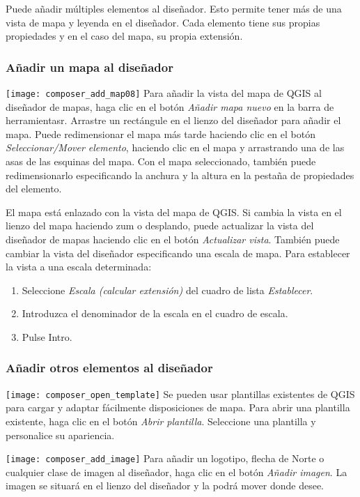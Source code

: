 Puede añadir múltiples elementos al diseñador. Esto permite tener más de una vista de mapa y leyenda en el diseñador. Cada elemento tiene sus propias propiedades y en el caso del mapa, su propia extensión.

\subsubsection{Añadir un mapa al diseñador}

\texttt{[image: composer\_add\_map08]} Para añadir la vista del mapa de QGIS al diseñador de mapas, haga clic en el botón \textit{Añadir mapa nuevo} en la barra de herramientasr. Arrastre un rectángule en el lienzo del diseñador para añadir el mapa. Puede redimensionar el mapa más tarde haciendo clic en el botón \textit{Seleccionar/Mover elemento}, haciendo clic en el mapa y arrastrando una de las asas de las esquinas del mapa. Con el mapa seleccionado, también puede redimensionarlo especificando la anchura y la altura en la pestaña de propiedades del elemento.

El mapa está enlazado con la vista del mapa de QGIS. Si cambia la vista en el lienzo del mapa haciendo zum o desplando, puede actualizar la vista del diseñador de mapas haciendo clic en el botón \textit{Actualizar vista}. También puede cambiar la vista del diseñador especificando una escala de mapa. Para establecer la vista a una escala determinada:

\begin{enumerate}
\item Seleccione \textit{Escala (calcular extensión)} del cuadro de lista \textit{Establecer}.
\item Introduzca el denominador de la escala en el cuadro de escala.
\item Pulse Intro.
\end{enumerate} 

\subsubsection{Añadir otros elementos al diseñador} 
 
\texttt{[image: composer\_open\_template]} Se pueden usar plantillas existentes de QGIS para cargar y adaptar fácilmente disposiciones de mapa. Para abrir una plantilla existente, haga clic en el botón \textit{Abrir plantilla}. Seleccione una plantilla y personalice su apariencia. 

\texttt{[image: composer\_add\_image]} Para añadir un logotipo, flecha de Norte o cualquier clase de imagen al diseñador, haga clic en el botón \textit{Añadir imagen}. La imagen se situará en el lienzo del diseñador y la podrá mover donde desee. 

